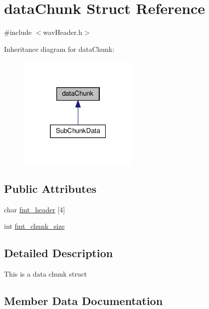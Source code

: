 \hypertarget{structdataChunk}{}\section{data\+Chunk Struct Reference}
\label{structdataChunk}


{\ttfamily \#include $<$wav\+Header.\+h$>$}



Inheritance diagram for data\+Chunk\+:\nopagebreak
\begin{figure}[H]
\begin{center}
\leavevmode
\includegraphics[width=163pt]{structdataChunk__inherit__graph}
\end{center}
\end{figure}
\subsection*{Public Attributes}
\begin{DoxyCompactItemize}
\item 
char \hyperlink{structdataChunk_a846343045c6f7168e969f3a4f19a44e1}{fmt\+\_\+header} \mbox{[}4\mbox{]}
\item 
int \hyperlink{structdataChunk_ab34bbfab5f9c6f68319a493844219a2e}{fmt\+\_\+chunk\+\_\+size}
\end{DoxyCompactItemize}


\subsection{Detailed Description}
This is a data chunk struct 

\subsection{Member Data Documentation}
\mbox{\label{structdataChunk_ab34bbfab5f9c6f68319a493844219a2e}} 
